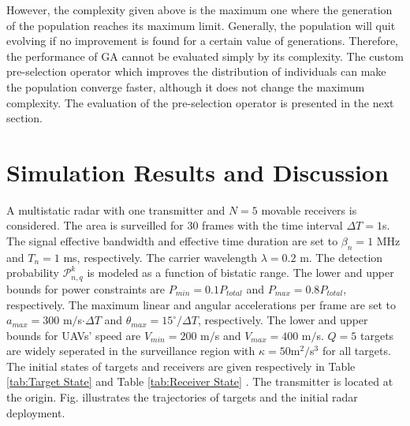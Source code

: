 \documentclass[12pt,journal,draftclsnofoot,onecolumn]{IEEEtran}
\begin{document}

However, the complexity given above is the maximum one where the generation of the population reaches its maximum limit. Generally, the population will quit evolving if no improvement is found for a certain value of generations. Therefore, the performance of GA cannot be evaluated simply by its complexity. The custom pre-selection operator which improves the distribution of individuals can make the population converge faster, although it does not change the maximum complexity. The evaluation of the pre-selection operator is presented in the next section.

\section{Simulation Results and Discussion} %
 A multistatic radar with one transmitter and $N=5$ movable receivers is considered. The area is surveilled for 30 frames with the time interval $\Delta T = 1$s. The signal effective bandwidth and effective time duration are set to $\beta_n=1$ MHz and $T_n=1$ ms, respectively. The carrier wavelength $\lambda=0.2$ m. The detection probability $\mathcal{P}_{n,q}^k$ is modeled as a function of bistatic range\cite{sinha2005autonomous}. The lower and upper bounds for power constraints are $P_{min}=0.1P_{total}$ and $P_{max}=0.8P_{total}$, respectively. The maximum linear and angular accelerations per frame are set to $a_{max}=300$ m$/$s$\cdot\Delta T$ and $\theta_{max}=15^\circ / \Delta T$, respectively. The lower and upper bounds for UAVs' speed are $V_{min}=200$ m$/$s and $V_{max}=400$ m$/$s. $Q=5$ targets are widely seperated in the surveillance region with $\kappa=50$m$^2/$s$^3$ for all targets. The initial states of targets  and receivers are given respectively in Table \ref{tab:Target State} and Table \ref{tab:Receiver State}%
. The transmitter is located at the origin. Fig. %
illustrates the trajectories of targets and the initial radar deployment.
\end{document}
